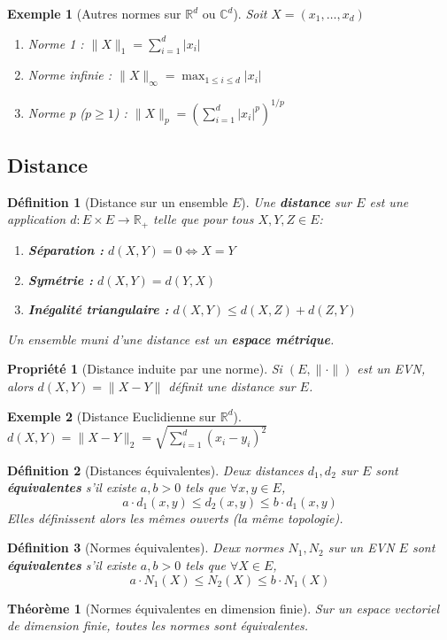 \documentclass[a4paper]{article}
\newcommand{\R}{\mathbb{R}}
\newcommand{\C}{\mathbb{C}} %
\newtheorem{theorem}{Théorème}[section]
\newtheorem{definition}{Définition}[section]
\newtheorem{exemple}{Exemple}[section]
\newtheorem{propriete}{Propriété}[section] %
\begin{document}
   \begin{exemple}[Autres normes sur \(\R^d\) ou \(\C^d\)] Soit \(X = (x_1, \ldots, x_d)\)
      \begin{enumerate}
          \item Norme 1 : \(\|X\|_1 = \sum_{i=1}^{d} |x_i|\)
          \item Norme infinie : \(\|X\|_\infty = \max_{1 \le i \le d} |x_i|\)
          \item Norme p (\(p \ge 1\)) : \(\|X\|_p = \left( \sum_{i=1}^{d} |x_i|^p \right)^{1/p}\)
      \end{enumerate}
   \end{exemple}

\subsection{Distance}
   \begin{definition}[Distance sur un ensemble \(E\)]
       Une \textbf{distance} sur \(E\) est une application \(d: E \times E \to \R_+\) telle que pour tous \(X,Y,Z \in E\):
       \begin{enumerate}
           \item \textbf{Séparation :} \(d(X,Y) = 0 \iff X = Y\)
           \item \textbf{Symétrie :} \(d(X, Y) = d(Y, X)\)
           \item \textbf{Inégalité triangulaire :} \(d(X, Y) \le d(X, Z) + d(Z, Y)\)
       \end{enumerate}
       Un ensemble muni d'une distance est un \textbf{espace métrique}.
   \end{definition}
   \begin{propriete}[Distance induite par une norme]
       Si \((E, \|\cdot\|)\) est un EVN, alors \(d(X,Y) = \|X-Y\|\) définit une distance sur \(E\).
   \end{propriete}
   \begin{exemple}[Distance Euclidienne sur \(\R^d\)]
        \(d(X, Y) = \|X - Y\|_2 = \sqrt{\sum_{i=1}^d (x_i - y_i)^2 }\)
   \end{exemple}
   \begin{definition}[Distances équivalentes]
       Deux distances \(d_1, d_2\) sur \(E\) sont \textbf{équivalentes} s'il existe \(a,b > 0\) tels que \(\forall x,y \in E\),
       \[ a \cdot d_1(x,y) \le d_2(x,y) \le b \cdot d_1(x,y) \]
       Elles définissent alors les mêmes ouverts (la même topologie).
   \end{definition}
   \begin{definition}[Normes équivalentes]
       Deux normes \(N_1, N_2\) sur un EVN \(E\) sont \textbf{équivalentes} s'il existe \(a,b > 0\) tels que \(\forall X \in E\),
       \[ a \cdot N_1(X) \le N_2(X) \le b \cdot N_1(X) \]
   \end{definition}
   \begin{theorem}[Normes équivalentes en dimension finie]
       Sur un espace vectoriel de dimension finie, toutes les normes sont équivalentes.
   \end{theorem}
\end{document}
